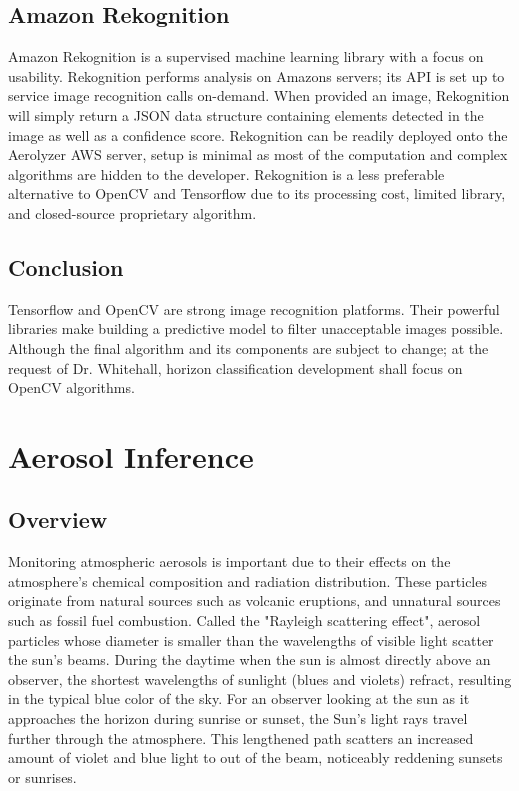 \documentclass[onecolumn, draftclsnofoot,10pt, compsoc]{IEEEtran}
\begin{document}
\begin{singlespace}
	\subsection{Amazon Rekognition}
		Amazon Rekognition is a supervised machine learning library with a focus on usability.
		Rekognition performs analysis on Amazons servers; its API is set up to service image recognition calls on-demand.
		When provided an image, Rekognition will simply return a JSON data structure containing elements detected in the image as well as a confidence score.
		Rekognition can be readily deployed onto the Aerolyzer AWS server, setup is minimal as most of the computation and complex algorithms are hidden to the developer.
		Rekognition is a less preferable alternative to OpenCV and Tensorflow due to its processing cost, limited library, and closed-source proprietary algorithm.	\cite{amazon}

	\subsection{Conclusion}
		Tensorflow and OpenCV are strong image recognition platforms.
		Their powerful libraries make building a predictive model to filter unacceptable images possible.
		Although the final algorithm and its components are subject to change; at the request of Dr.
		Whitehall, horizon classification development shall focus on OpenCV algorithms.

\section{Aerosol Inference}
	\subsection{Overview}
		Monitoring atmospheric aerosols is important due to their effects on the atmosphere's chemical composition and radiation distribution.
		These particles originate from natural sources such as volcanic eruptions, and unnatural sources such as fossil fuel combustion.
		Called the "Rayleigh scattering effect", aerosol particles whose diameter is smaller than the wavelengths of visible light scatter the sun’s beams.
		During the daytime when the sun is almost directly above an observer, the shortest wavelengths of sunlight (blues and violets) refract, resulting in the typical blue color of the sky.
		For an observer looking at the sun as it approaches the horizon during sunrise or sunset, the Sun’s light rays travel further through the atmosphere.
		This lengthened path scatters an increased amount of violet and blue light to out of the beam, noticeably reddening sunsets or sunrises. \cite{corfidi_2014}
		


\end{singlespace}
\end{document}
